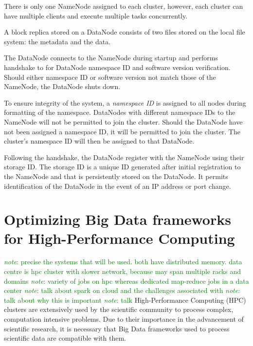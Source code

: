\documentclass{report}
\newcommand{\note}[1]{\textcolor{green}{\textit{note}: #1}}
\begin{document}
        There is only one NameNode assigned to each cluster, however, 
        each cluster can have multiple clients and execute multiple 
        tasks concurrently.


        A block replica stored on a DataNode consists of two files 
        stored on the local file system: the metadata and the data. 

        The DataNode connects to the NameNode during startup and 
        performs handshake to for DataNode namespace ID and 
        software version verification. Should either namespace ID 
        or software version not match those of the NameNode, the 
        DataNode shuts down.

        To ensure integrity of the system, a \textit{namespace ID} 
        is assigned to all nodes during formatting of the namespace. 
        DataNodes with different namespace IDs to the NameNode will 
        not be permitted to join the cluster. Should the DataNode
        have not been assigned a namespace ID, it will be permitted 
        to join the cluster. The cluster's namespace ID will then be 
        assigned to that DataNode.


        Following the handshake, the DataNode register with the 
        NameNode using their storage ID. The storage ID is a unique 
        ID generated after initial registration to the NameNode and 
        that is persistently stored on the DataNode. It permits
        identification of the DataNode in the event of an IP address 
        or port change. 
        

\chapter{Optimizing Big Data frameworks for High-Performance Computing}
	
    \note{precise the systems that will be used. both have distributed memory.
data centre is hpc cluster with slower network, because may span multiple racks
and domains} \note{variety of jobs on hpc whereas dedicated map-reduce jobs in a
data center} \note{talk about spark on cloud and the challenges associated with}
\note{talk about why this is important} \note{talk } High-Performance Computing
(HPC) clusters are extensively used by the scientific community to process
complex, computation intensive problems. Due to their importance in the
advancement of scientific research, it is necessary that Big Data frameworks
used to process scientific data are compatible with them. 
	
\end{document}
